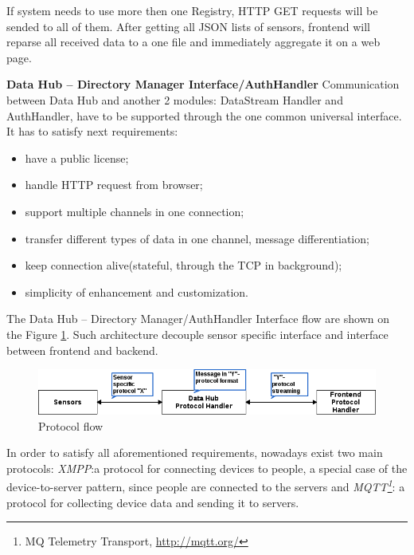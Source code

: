       If system needs to use more then one Registry, HTTP GET requests will be sended to all of them. After getting all JSON lists of sensors, frontend will reparse all received data to a one file and immediately aggregate it on a web page.

      \textbf{Data Hub -- Directory Manager Interface/AuthHandler}
      \newline
      Communication between Data Hub and another 2 modules: DataStream Handler and AuthHandler, have to be supported through the one common universal interface. It has to satisfy next requirements:
      \begin{itemize}
      \item have a public license;
      \item handle HTTP request from browser;
      \item support multiple channels in one connection;
      \item transfer different types of data in one channel, message differentiation;
      \item keep connection alive(stateful, through the TCP in background);
      \item simplicity of enhancement and customization.
      \end{itemize}

      The Data Hub -- Directory Manager/AuthHandler Interface flow are shown on the Figure \ref{img:protocol}. Such architecture decouple sensor specific interface and interface between frontend and backend.

      \begin{figure}[!ht]
      \centering
      \includegraphics[scale=0.6]{images/Protocol_flow.png}   
      \caption[Protocol flow]{Protocol flow}
      \label{img:protocol}                           
      \end{figure}

      In order to satisfy all aforementioned requirements, nowadays exist two main protocols: \emph{XMPP\cite{XMPPbook}}:a protocol for connecting devices to people, a special case of the device-to-server pattern, since people are connected to the servers and \emph{MQTT\footnote{MQ Telemetry Transport, \url{http://mqtt.org/}}}: a protocol for collecting device data and sending it to servers. 

